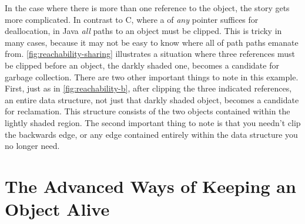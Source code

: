 In the case where there is more than one reference to the object, the story gets
more complicated. In contrast to C, where a  of \emph{any} pointer
suffices for deallocation, in Java \emph{all} paths to an object must be
clipped. This is tricky in many cases, because it may not
be easy to know where all of path paths emanate from.
\autoref{fig:reachability-sharing} illustrates a situation where three references
must be clipped before an object, the darkly shaded one, becomes a candidate for
garbage collection. There are two other important things to note in this example.
First, just as in \autoref{fig:reachability-b}, after clipping the three
indicated references, an entire data structure, not just that darkly shaded
object, becomes a candidate for reclamation. This structure consists of the two
objects contained within the lightly shaded region. The second important thing to
note is that you needn't clip the backwards edge, or any edge contained entirely
within the data structure you no longer need.

\section{The Advanced Ways of Keeping an Object Alive}


